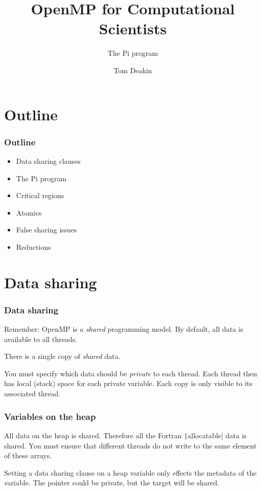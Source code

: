 \documentclass{beamer}
\author{Tom Deakin}
\title{OpenMP for Computational Scientists}
\subtitle{The Pi program}
\begin{document}
\frame{\titlepage}


\section{Outline}
\begin{frame}
\frametitle{Outline}
\begin{itemize}
  \item Data sharing clauses
  \item The Pi program
  \item Critical regions
  \item Atomics
  \item False sharing issues
  \item Reductions
\end{itemize}
\end{frame}

\section{Data sharing}
\begin{frame}
\frametitle{Data sharing}
Remember: OpenMP is a \emph{shared} programming model.
By default, all data is available to all threads.

There is a single copy of \emph{shared} data.

You must specify which data should be \emph{private} to each thread.
Each thread then has local (stack) space for each private variable.
Each copy is only visible to its associated thread.
\end{frame}


\begin{frame}
\frametitle{Variables on the heap}
All data on the heap is shared.
Therefore all the Fortran \texttt|allocatable| data is shared.
You must ensure that different threads do not write to the same element of these arrays.

Setting a data sharing clause on a heap variable only effects the metadata of the variable.
The pointer could be private, but the target will be shared.
\end{frame}

\end{document}
